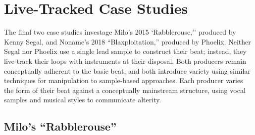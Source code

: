 

\section{Live-Tracked Case Studies}
The final two case studies investage Milo's 2015 `Rabblerouse,'' produced by Kenny Segal, and Noname's 2018 ``Blaxploitation,'' produced by Phoelix. Neither Segal nor Phoelix use a single lead sample to construct their beat; instead, they live-track their loops with instruments at their disposal. Both producers remain conceptually adherent to the basic beat, and both introduce variety using similar techniques for manipulation to sample-based approaches. Each producer varies the form of their beat against a conceptually mainstream structure, using vocal samples and musical styles to communicate alterity.

\subsection*{\centering Milo's ``Rabblerouse''}

